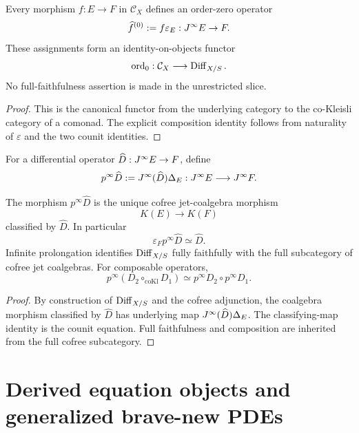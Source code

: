 \begin{proposition}
\label{prop:order-zero-operators}
Every morphism $f:E\to F$ in $\mathcal C_X$ defines an order-zero operator
\[
    \widehat f^{(0)}:=f\varepsilon_E:J^{\infty} E\to F.
\]
These assignments form an identity-on-objects functor
\[
    \operatorname{ord}_0:\mathcal C_X\longrightarrow\operatorname{Diff}_{X/S}.
\]
No full-faithfulness assertion is made in the unrestricted slice.
\end{proposition}

\begin{proof}
This is the canonical functor from the underlying category to the co-Kleisli category of a comonad.  The explicit composition identity follows from naturality of $\varepsilon$ and the two counit identities.
\end{proof}

\begin{definition}
\label{def:operator-prolongation}
For a differential operator $\widehat D:J^{\infty} E\to F$, define
\[
    p^\infty\widehat D
    :=
    J^{\infty}(\widehat D)\Delta_E:
    J^{\infty} E\longrightarrow J^{\infty} F.
\]
\end{definition}

\begin{theorem}
\label{prop:prolongation-cartan}
\label{thm:diff-cofree-embedding}
The morphism $p^\infty\widehat D$ is the unique cofree jet-coalgebra morphism
\[
    K(E)\longrightarrow K(F)
\]
classified by $\widehat D$.  In particular
\[
    \varepsilon_Fp^\infty\widehat D\simeq\widehat D.
\]
Infinite prolongation identifies $\operatorname{Diff}_{X/S}$ fully faithfully with the full subcategory of cofree jet coalgebras.  For composable operators,
\[
    p^\infty(D_2\circ_{\mathrm{coKl}}D_1)
    \simeq
    p^\infty D_2\circ p^\infty D_1.
\]
\end{theorem}

\begin{proof}
By construction of $\operatorname{Diff}_{X/S}$ and the cofree adjunction, the coalgebra morphism classified by $\widehat D$ has underlying map $J^{\infty}(\widehat D)\Delta_E$.  The classifying-map identity is the counit equation.  Full faithfulness and composition are inherited from the full cofree subcategory.
\end{proof}

\section{Derived equation objects and generalized brave-new PDEs}
\label{sec:equation-loci}
\label{sec:generalized-pdes}

